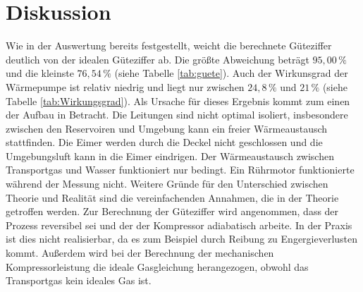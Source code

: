\section{Diskussion}
\label{sec:Diskussion}
Wie in der Auswertung bereits festgestellt, weicht die berechnete Güteziffer deutlich von der idealen Güteziffer ab.
Die größte Abweichung beträgt $95,00 \, \%$ und die kleinste $76,54 \, \%$ (siehe Tabelle \ref{tab:guete}).
Auch der Wirkunsgrad der Wärmepumpe ist relativ niedrig und liegt nur zwischen $24,8 \, \%$ und $21 \, \%$ (siehe Tabelle \ref{tab:Wirkungsgrad}).
Als Ursache für dieses Ergebnis kommt zum einen der Aufbau in Betracht.
Die Leitungen sind nicht optimal isoliert, insbesondere zwischen den Reservoiren und Umgebung kann ein freier Wärmeaustausch stattfinden.
Die Eimer werden durch die Deckel nicht geschlossen und die Umgebungsluft kann in die Eimer eindrigen.
Der Wärmeaustausch zwischen Transportgas und Wasser funktioniert nur bedingt.
Ein Rührmotor funktionierte während der Messung nicht.
Weitere Gründe für den Unterschied zwischen Theorie und Realität sind die vereinfachenden Annahmen, die in der Theorie getroffen werden.
Zur Berechnung der Güteziffer wird angenommen, dass der Prozess reversibel sei und der der Kompressor adiabatisch arbeite.
In der Praxis ist dies nicht realisierbar, da es zum Beispiel durch Reibung zu Engergieverlusten kommt.
Außerdem wird bei der Berechnung der mechanischen Kompressorleistung die ideale Gasgleichung herangezogen, obwohl das Transportgas kein ideales Gas ist.
